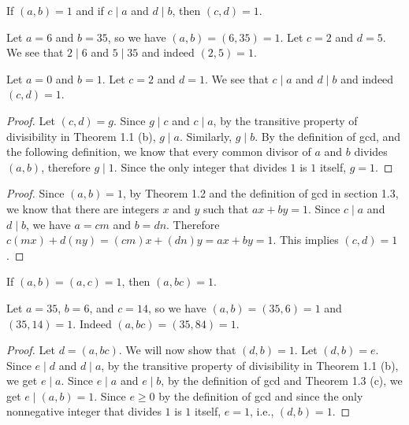 \begin{exercise}{1}
  If \( (a, b) = 1 \) and if \( c \mid a \) and \( d \mid b \), then
  \( (c, d) = 1 \).
\end{exercise}

\begin{example}
  Let \( a = 6 \) and \( b = 35 \), so we have \( (a, b) = (6, 35) = 1
  \). Let \( c = 2 \) and \( d = 5 \). We see that \( 2 \mid 6 \) and
  \( 5 \mid 35 \) and indeed \( (2, 5) = 1 \).
\end{example}

\begin{example}
  Let \( a = 0 \) and \( b = 1 \). Let \( c = 2 \) and \( d = 1 \). We
  see that \( c \mid a \) and \( d \mid b \) and indeed \( (c, d) = 1
  \).
\end{example}

\begin{proof}
  Let \( (c, d) = g \). Since \( g \mid c \) and \( c \mid a \), by
  the transitive property of divisibility in Theorem 1.1 (b), \( g
  \mid a \). Similarly, \( g \mid b \). By the definition of gcd, and
  the following definition, we know that every common divisor of \( a
  \) and \( b \) divides \( (a, b) \), therefore \( g \mid 1 \). Since
  the only integer that divides \( 1 \) is \( 1 \) itself, \( g = 1
  \).
\end{proof}

\begin{proof}
  Since \( (a, b) = 1 \), by Theorem 1.2 and the definition of gcd in
  section 1.3, we know that there are integers \( x \) and \( y \)
  such that \( ax + by = 1 \). Since \( c \mid a \) and \( d \mid b
  \), we have \( a = cm \) and \( b = dn \). Therefore \( c(mx) +
  d(ny) = (cm)x + (dn)y = ax + by = 1 \). This implies \( (c, d) = 1
  \).
\end{proof}


\begin{exercise}{2}
  If \( (a, b) = (a, c) = 1 \), then \( (a, bc) = 1 \).
\end{exercise}

\begin{example}
  Let \( a = 35 \), \( b = 6 \), and \( c = 14 \), so we have \( (a,
  b) = (35, 6) = 1 \) and \( (35, 14) = 1 \). Indeed \( (a, bc) = (35,
  84) = 1 \).
\end{example}

\begin{proof}
  Let \( d = (a, bc) \). We will now show that \( (d, b) = 1 \). Let
  \( (d, b) = e \). Since \( e \mid d \) and \( d \mid a \), by the
  transitive property of divisibility in Theorem 1.1 (b), we get \( e
  \mid a \). Since \( e \mid a \) and \( e \mid b \), by the
  definition of gcd and Theorem 1.3 (c), we get \( e \mid (a, b) = 1
  \). Since \( e \ge 0 \) by the definition of gcd and since the only
  nonnegative integer that divides \( 1 \) is \( 1 \) itself, \( e = 1
  \), i.e., \( (d, b) = 1 \).
\end{proof}

